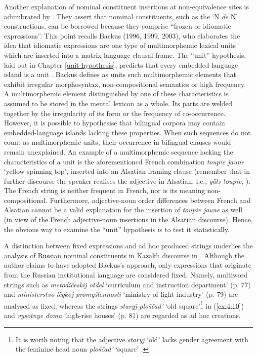 Another explanation of nominal constituent insertions at non-equivalence sites is adumbrated by \citet[215]{poplack-meechan-1995}. They assert that nominal constituents, such as the `N \textit{de} N' constructions, can be borrowed because they comprise ``frozen or idiomatic expressions''. This point recalls Backus (1996, 1999, 2003), who elaborates the idea that idiomatic expressions are one type of multimorphemic lexical units which are inserted into a matrix language clausal frame. The ``unit'' hypothesis, laid out in Chapter \ref{unit-hypothesis}, predicts that every embedded-language island is a unit \citep[cf.][91]{backus-units-2003}. Backus defines as units such multimorphemic elements that exhibit irregular morphosyntax, non-compositional semantics or high frequency. A multimorphemic element distinguished by one of these characteristics is assumed to be stored in the mental lexicon as a whole. Its parts are welded together by the irregularity of its form or the frequency of co-occurrence. However, it is possible to hypothesise that bilingual corpora may contain embedded-language islands lacking these properties. When such sequences do not count as multimorphemic units, their occurrence in bilingual clauses would remain unexplained. An example of a multimorphemic sequence lacking the characteristics of a unit is the aforementioned French combination \textit{toupie jaune} `yellow spinning top', inserted into an Alsatian framing clause (remember that in further discourse the speaker realises the adjective in Alsatian, i.e., \textit{gäls toupie}, \citealt[133]{gardner-chloros-1991}). The French string is neither frequent in French, nor is its meaning non-compositional. Furthermore, adjective-noun order differences between French and Alsatian cannot be a valid explanation for the insertion of \textit{toupie jaune} as well (in view of the French adjective-noun insertions in the Alsatian discourse). Hence, the obvious way to examine the ``unit'' hypothesis is to test it statistically.

A distinction between fixed expressions and ad hoc produced strings underlies the analysis of Russian nominal constituents in Kazakh discourse in \citet[77-88]{muhamedowa-untersuchung-2006}. Although the author claims to have adopted Backus's approach, only expressions that originate from the Russian institutional language are considered fixed. Namely, multiword strings such as \textit{metodičeskij otdel} `curriculum and instruction department' (p. 77) and  \textit{ministerstvo lëgkoj promyšlennosti} `ministry of light industry' (p. 79) are analysed as fixed, whereas the strings \textit{staryj ploščad'} `old square'\footnote{It is worth noting that the adjective \textit{staryj} `old' lacks gender agreement with the feminine head noun \textit{ploščad'} `square' \citep[82]{muhamedowa-untersuchung-2006}.} in (\ref{ex:4:10}) and \textit{vysotnye doma} `high-rise houses' (p. 81) are regarded as ad hoc creations. 

